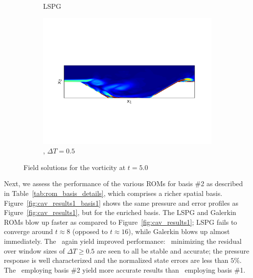 \begin{figure}
\begin{center}
\begin{subfigure}[t]{0.95\textwidth}
\caption{LSPG} 
\end{subfigure}
\begin{subfigure}[t]{0.95\textwidth}
\includegraphics[trim={0cm 3.9cm 0cm 3.9cm},clip,width=1.\linewidth]{figs/cavity/u_c5_t5_basis2.pdf}
\caption{\methodAcronym, $\Delta T = 0.5$} 
\end{subfigure}
\caption{Field solutions for the vorticity at $t = 5.0$}
\label{fig:cav_snapshots}
\end{center}
\end{figure}


Next, we assess the performance of the various ROMs for basis \#2 as described in Table~\ref{tab:rom_basis_details}, which comprises a richer spatial basis.
 Figure~\ref{fig:cav_results1_basis1} shows the same pressure and error profiles as Figure~\ref{fig:cav_results1}, but for the enriched basis. The LSPG and Galerkin ROMs blow up faster as compared to Figure~\ref{fig:cav_results1}; LSPG fails to converge around $t \approx 8$ (opposed to $t \approx 16$), while Galerkin blows up almost immediately. The 
\methodAcronymROMs\ again yield improved performance: \methodAcronymROMs\ minimizing the residual over window sizes of $\Delta T \ge 0.5$ are seen to all be stable and accurate; the pressure response is well characterized and the normalized state errors are less than $5\%$. The \methodAcronymROMs\ employing basis \#2 yield more accurate results than \methodAcronymROMs\ employing basis \#1.
 

